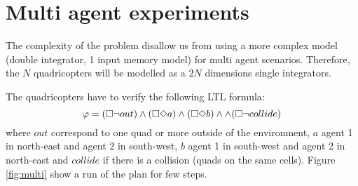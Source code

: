 \section{Multi agent experiments}
The complexity of the problem disallow us from using a more complex model (double integrator, 1 input memory model) for multi agent scenarios.
Therefore, the $N$ quadricopters will be modelled as a $2N$ dimensions single integrators.

The quadricopters have to verify the following LTL formula:
$$ \varphi = (\square \neg out) \wedge (\square \Diamond a) \wedge (\square \Diamond b) \wedge \wedge (\square \neg collide)$$
where $out$ correspond to one quad or more outside of the environment, $a$ agent 1 in north-east and agent 2 in south-west, $b$ agent 1 in south-west and agent 2 in north-east and $collide$ if there is a collision (quads on the same cells).
Figure \ref{fig:multi} show a run of the plan for few steps.



